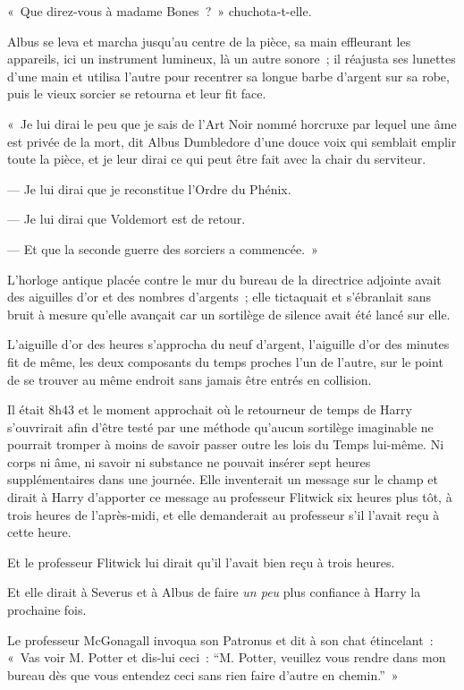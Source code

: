 «~Que direz-vous à madame Bones~?~»
chuchota-t-elle.

Albus se leva et marcha jusqu'au centre de la pièce, sa main effleurant les appareils, ici un instrument lumineux, là un autre sonore~; il réajusta ses lunettes d'une main et utilisa l'autre pour recentrer sa longue barbe d'argent sur sa robe, puis le vieux sorcier se retourna et leur fit face.

«~Je lui dirai le peu que je sais de l'Art Noir nommé horcruxe par lequel une âme est privée de la mort, dit Albus Dumbledore d'une douce voix qui semblait emplir toute la pièce, et je leur dirai ce qui peut être fait avec la chair du serviteur.

--- Je lui dirai que je reconstitue l'Ordre du Phénix.

--- Je lui dirai que Voldemort est de retour.

--- Et que la seconde guerre des sorciers a commencée.~»


L'horloge antique placée contre le mur du bureau de la directrice adjointe avait des aiguilles d'or et des nombres d'argents~; elle tictaquait et s'ébranlait sans bruit à mesure qu'elle avançait car un sortilège de silence avait été lancé sur elle.

L'aiguille d'or des heures s'approcha du neuf d'argent, l'aiguille d'or des minutes fit de même, les deux composants du temps proches l'un de l'autre, sur le point de se trouver au même endroit sans jamais être entrés en collision.

Il était 8h43 et le moment approchait où le retourneur de temps de Harry s'ouvrirait afin d'être testé par une méthode qu'aucun sortilège imaginable ne pourrait tromper à moins de savoir passer outre les lois du Temps lui-même.
Ni corps ni âme, ni savoir ni substance ne pouvait insérer sept heures supplémentaires dans une journée.
Elle inventerait un message sur le champ et dirait à Harry d'apporter ce message au professeur Flitwick six heures plus tôt, à trois heures de l'après-midi, et elle demanderait au professeur s'il l'avait reçu à cette heure.

Et le professeur Flitwick lui dirait qu'il l'avait bien reçu à trois heures.

Et elle dirait à Severus et à Albus de faire \emph{un peu} plus confiance à Harry la prochaine fois.

Le professeur McGonagall invoqua son Patronus et dit à son chat étincelant~: «~Vas voir M. Potter et dis-lui ceci~: “M. Potter, veuillez vous rendre dans mon bureau dès que vous entendez ceci sans rien faire d'autre en chemin.”~»
